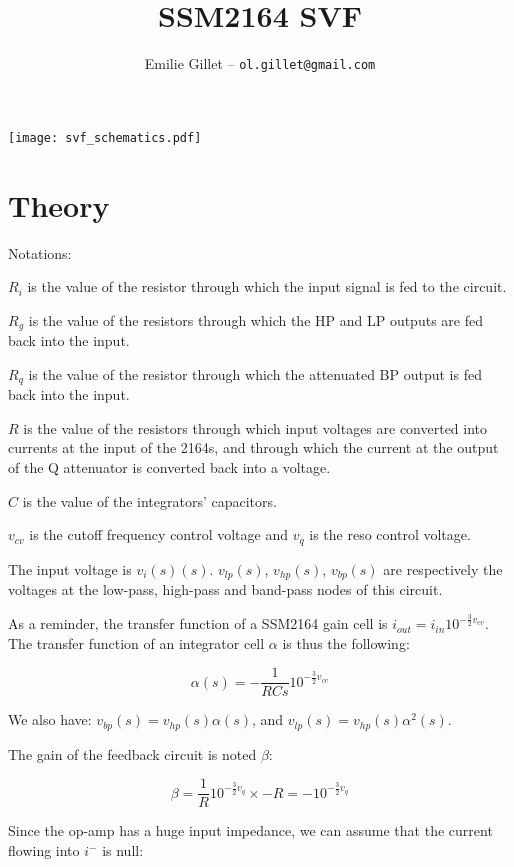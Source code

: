 \documentclass[a4paper,11pt]{article}
\title{SSM2164 SVF}
\author{Emilie Gillet -- \tt ol.gillet@gmail.com}
\date{}
\begin{document}
\maketitle

\texttt{[image: svf\_schematics.pdf]}

\section{Theory}

Notations:

$R_i$ is the value of the resistor through which the input signal is fed to the circuit.

$R_g$ is the value of the resistors through which the HP and LP outputs are fed back into the input.

$R_q$ is the value of the resistor through which the attenuated BP output is fed back into the input.

$R$ is the value of the resistors through which input voltages are converted into currents at the input of the 2164s, and through which the current at the output of the Q attenuator is converted back into a voltage.

$C$ is the value of the integrators' capacitors.

$v_{cv}$ is the cutoff frequency control voltage and $v_{q}$ is the reso control voltage.


The input voltage is $v_i(s)(s)$. $v_{lp}(s)$, $v_{hp}(s)$, $v_{bp}(s)$ are respectively the voltages at the low-pass, high-pass and band-pass nodes of this circuit.

As a reminder, the transfer function of a SSM2164 gain cell is $i_{out} = i_{in} 10^{-\frac{3}{2} v_{cv}}$. The transfer function of an integrator cell $\alpha$ is thus the following:

\begin{equation}
\alpha(s) = -\frac{1}{RCs} 10^{-\frac{3}{2} v_{cv}}
\end{equation}

We also have: $v_{bp}(s) = v_{hp}(s) \alpha(s)$, and $v_{lp}(s) = v_{hp}(s) \alpha^2(s)$.

The gain of the feedback circuit is noted $\beta$:

\begin{equation}
\beta = \frac{1}{R} 10^{-\frac{3}{2} v_{q}} \times -R = -10^{-\frac{3}{2} v_{q}}
\end{equation}

Since the op-amp has a huge input impedance, we can assume that the current flowing into $i^-$ is null:
\end{document}
